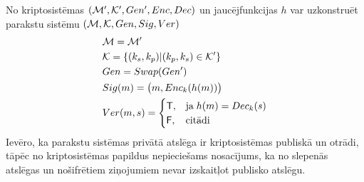 No kriptosistēmas $(\mathcal{M}', \mathcal{K}', Gen', Enc, Dec)$ un jaucējfunkcijas $h$ var uzkonstruēt parakstu sistēmu $(\mathcal{M}, \mathcal{K}, Gen, Sig, Ver)$
\begin{align*}
    & \mathcal{M} = \mathcal{M}' \\
    & \mathcal{K} = \left\{ (k_s, k_p) | (k_p, k_s) \in \mathcal{K}' \right\} \\
    & Gen = Swap(Gen') \\
    & Sig(m) = \big(m, Enc_k(h(m))\big)  \\
    & Ver(m,s) =
    \begin{cases}
        \textsf{T}, &\text{ja}\; h(m) = Dec_k(s) \\
        \textsf{F}, &\text{citādi}
    \end{cases}
\end{align*}
Ievēro, ka parakstu sistēmas privātā atslēga ir kriptosistēmas publiskā un otrādi, tāpēc no kriptosistēmas papildus nepieciešams nosacījums, ka no slepenās atslēgas un nošifrētiem ziņojumiem nevar izskaitļot publisko atslēgu.
